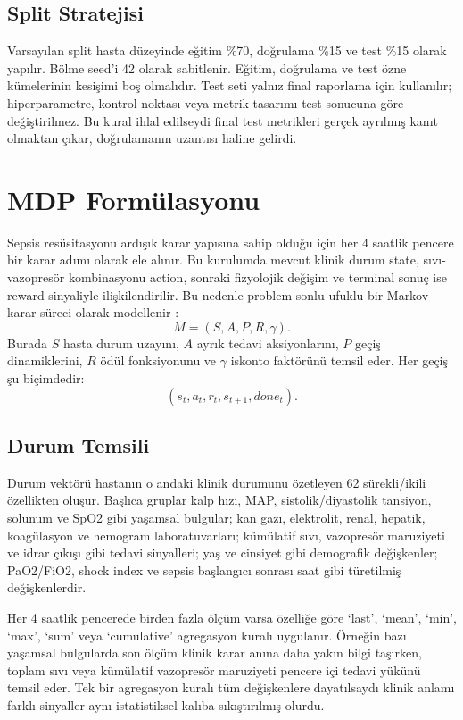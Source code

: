 \documentclass[conference]{IEEEtran}
\begin{document}
\subsection{Split Stratejisi}
Varsayılan split hasta düzeyinde eğitim \%70, doğrulama \%15 ve test \%15 olarak yapılır. Bölme seed'i 42 olarak sabitlenir. Eğitim, doğrulama ve test özne kümelerinin kesişimi boş olmalıdır. Test seti yalnız final raporlama için kullanılır; hiperparametre, kontrol noktası veya metrik tasarımı test sonucuna göre değiştirilmez. Bu kural ihlal edilseydi final test metrikleri gerçek ayrılmış kanıt olmaktan çıkar, doğrulamanın uzantısı haline gelirdi.

\section{MDP Formülasyonu}
Sepsis resüsitasyonu ardışık karar yapısına sahip olduğu için her 4 saatlik pencere bir karar adımı olarak ele alınır. Bu kurulumda mevcut klinik durum state, sıvı-vazopresör kombinasyonu action, sonraki fizyolojik değişim ve terminal sonuç ise reward sinyaliyle ilişkilendirilir. Bu nedenle problem sonlu ufuklu bir Markov karar süreci olarak modellenir \cite{sutton2018rl}:
\begin{equation}
M=(S,A,P,R,\gamma).
\end{equation}
Burada $S$ hasta durum uzayını, $A$ ayrık tedavi aksiyonlarını, $P$ geçiş dinamiklerini, $R$ ödül fonksiyonunu ve $\gamma$ iskonto faktörünü temsil eder. Her geçiş şu biçimdedir:
\begin{equation}
(s_t,a_t,r_t,s_{t+1},done_t).
\end{equation}

\subsection{Durum Temsili}
Durum vektörü hastanın o andaki klinik durumunu özetleyen 62 sürekli/ikili özellikten oluşur. Başlıca gruplar kalp hızı, MAP, sistolik/diyastolik tansiyon, solunum ve SpO2 gibi yaşamsal bulgular; kan gazı, elektrolit, renal, hepatik, koagülasyon ve hemogram laboratuvarları; kümülatif sıvı, vazopresör maruziyeti ve idrar çıkışı gibi tedavi sinyalleri; yaş ve cinsiyet gibi demografik değişkenler; PaO2/FiO2, shock index ve sepsis başlangıcı sonrası saat gibi türetilmiş değişkenlerdir.

Her 4 saatlik pencerede birden fazla ölçüm varsa özelliğe göre `last', `mean', `min', `max', `sum' veya `cumulative' agregasyon kuralı uygulanır. Örneğin bazı yaşamsal bulgularda son ölçüm klinik karar anına daha yakın bilgi taşırken, toplam sıvı veya kümülatif vazopresör maruziyeti pencere içi tedavi yükünü temsil eder. Tek bir agregasyon kuralı tüm değişkenlere dayatılsaydı klinik anlamı farklı sinyaller aynı istatistiksel kalıba sıkıştırılmış olurdu.
\end{document}
